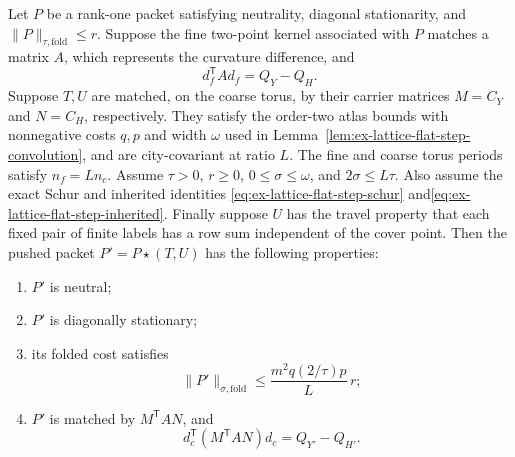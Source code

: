 \begin{proposition}
\label{prop:ex-lattice-flat-step}
Let $P$ be a rank-one packet satisfying neutrality, diagonal stationarity, and
$\|P\|_{\tau,\mathrm{fold}}\leq r$. Suppose the fine two-point kernel associated with $P$ matches a matrix $A$,
which represents the curvature difference, and
\[
 d_f^{\mathsf T}A d_f=Q_Y-Q_H.
\]
Suppose $T,U$ are matched, on the coarse torus, by their carrier matrices
$M=C_Y$ and $N=C_H$, respectively. They satisfy the order-two atlas bounds
with nonnegative costs $q,p$ and width $\omega$ used in
Lemma~\ref{lem:ex-lattice-flat-step-convolution}, and are city-covariant at
ratio $L$. The fine and coarse torus periods satisfy $n_f=Ln_c$. Assume
$\tau>0$, $r\geq0$, $0\leq\sigma\leq\omega$, and
$2\sigma\leq L\tau$. Also assume the exact Schur and inherited identities
\eqref{eq:ex-lattice-flat-step-schur} and\;\eqref{eq:ex-lattice-flat-step-inherited}. Finally suppose $U$ has the travel
property that each fixed pair of finite labels has a row sum independent of
the cover point. Then the pushed packet $P'=P\star(T,U)$ has the following
properties:
\begin{enumerate}
\item $P'$ is neutral;
\item $P'$ is diagonally stationary;
\item its folded cost satisfies
\[
 \|P'\|_{\sigma,\mathrm{fold}}
 \leq \frac{m^2q(2/\tau)p}{L}\,r;
\]
\item $P'$ is matched by $M^{\mathsf T}AN$, and
\[
 d_c^{\mathsf T}(M^{\mathsf T}AN)d_c=Q_{Y'}-Q_{H'}.
\]
\end{enumerate}
\end{proposition}

